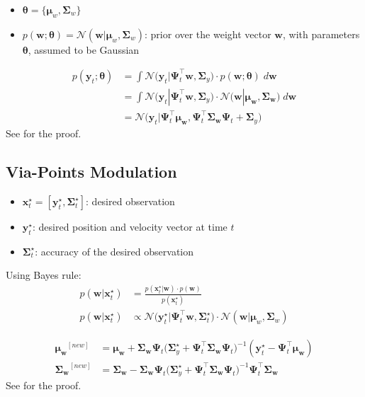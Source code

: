 \documentclass{article}
\begin{document}
\begin{itemize}
  \item $\bm{\theta} = \{\bm{\mu}_{w}, \bm{\Sigma}_{w}\}$
  \item $p(\bm{w};\bm{\theta}) = \mathcal{N}(\bm{w}|\bm{\mu}_{w}, \bm{\Sigma}_{w})$: prior over the weight vector $\bm{w}$, with parameters $\bm{\theta}$, assumed to be Gaussian
\end{itemize}

\begin{align}
p(\bm{y}_t; \bm{\theta}) &= \int \mathcal{N}\Big(\bm{y}_t|\bm{\Psi}^\top_t \bm{w}, \bm{\Sigma}_y \Big) \cdot p(\bm{w}; \bm{\theta}) \; d\bm{w}\\
&= \int \mathcal{N}\Big(\bm{y}_t|\bm{\Psi}^\top_t \bm{w}, \bm{\Sigma}_y \Big) \cdot \mathcal{N}\Big(\bm{w}|\bm{\mu_w}, \bm{\Sigma_w} \Big) \; d\bm{w}\\
&= \mathcal{N}\Big( \bm{y}_t | \bm{\Psi}^\top_t \bm{\mu_w}, \bm{\Psi}^\top_t \bm{\Sigma_w} \bm{\Psi}_t + \bm{\Sigma}_y \Big)\label{eq:HBM}
\end{align}
See  for the proof.


\subsection{Via-Points Modulation}

\begin{itemize}
    \item $\bm{x}_t^\star = [\bm{y}_t^\star, \bm{\Sigma}^\star_t]$: desired observation
    \item $\bm{y}^\star_t$: desired position and velocity vector at time $t$
    \item $\bm{\Sigma}^\star_t$: accuracy of the desired observation
\end{itemize}

Using Bayes rule:
\begin{align}
  p(\bm{w}|\bm{x}_t^\star) &= \frac{p(\bm{x}_t^\star|\bm{w}) \cdot p(\bm{w})}{p(\bm{x}_t^\star)} \\
  p(\bm{w}|\bm{x}_t^\star) &\propto \mathcal{N}\Big( \bm{y}_t^\star | \bm{\Psi}_t^\top\bm{w}, \bm{\Sigma}^\star_t \Big) \cdot \mathcal{N}(\bm{w}|\bm{\mu}_{w}, \bm{\Sigma}_{w})\label{eq:prob-cond-new}
\end{align}

\begin{align}
\bm{\mu_w}^{[new]} &= \bm{\mu_w} + \bm{\Sigma_w}\bm{\Psi}_t \Big(\bm{\Sigma}_y^\star + \bm{\Psi}_t^\top \bm{\Sigma_w}\bm{\Psi}_t \Big)^{-1} (\bm{y}_t^\star - \bm{\Psi}_t^\top \bm{\mu_w})\label{eq:mu-cond-new}\\
\bm{\Sigma_w}^{[new]} &= \bm{\Sigma_w} - \bm{\Sigma_w}\bm{\Psi}_t \Big(\bm{\Sigma}_y^\star +  \bm{\Psi}_t^\top \bm{\Sigma_w}\bm{\Psi}_t \Big)^{-1} \bm{\Psi}_t^\top \bm{\Sigma_w}\label{eq:sigma-cond-new}
\end{align}
See  for the proof.
\end{document}
